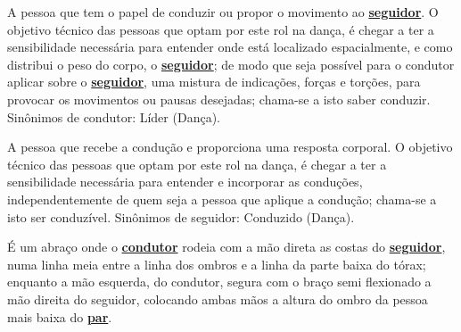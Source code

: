 \begin{definition} 
\label{def:Condutor} 
A pessoa que tem o papel de conduzir ou propor o movimento ao \hyperref[def:Seguidor]{\textbf{seguidor}}. 
O objetivo técnico das pessoas que optam por este rol na dança, é chegar 
a ter a sensibilidade necessária para entender onde está localizado espacialmente, 
e como distribui o peso do corpo, o \hyperref[def:Seguidor]{\textbf{seguidor}}; 
de modo que seja possível para o condutor aplicar sobre o \hyperref[def:Seguidor]{\textbf{seguidor}}, 
uma mistura de indicações, forças e torções,  
para provocar os movimentos ou pausas desejadas;
chama-se a isto saber conduzir.
Sinônimos de condutor: Líder (Dança).
\end{definition}

\begin{definition} 
\label{def:Seguidor} 
A pessoa que recebe a condução e proporciona uma resposta corporal. 
O objetivo técnico das pessoas que optam por este rol na dança, é chegar 
a ter a sensibilidade necessária para entender e incorporar as conduções,
independentemente de quem seja a pessoa que aplique a condução;
chama-se a isto ser conduzível.
Sinônimos de seguidor: Conduzido (Dança).
\end{definition}



\begin{definition}
\label{def:abracodedanca}  
É um abraço onde o \hyperref[def:Condutor]{\textbf{condutor}} 
rodeia com a mão direta as costas do \hyperref[def:Seguidor]{\textbf{seguidor}},
numa linha meia entre a linha dos ombros e a linha da parte baixa do tórax;
enquanto a mão esquerda, do condutor, segura com o braço semi flexionado a mão direita do seguidor,
colocando ambas mãos a altura do ombro da pessoa mais baixa do \hyperref[def:Par]{\textbf{par}}.
\end{definition}


